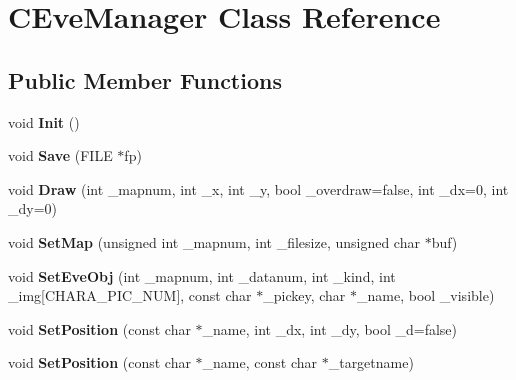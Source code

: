 \hypertarget{class_c_eve_manager}{}\section{C\+Eve\+Manager Class Reference}
\label{class_c_eve_manager}
\subsection*{Public Member Functions}
\begin{DoxyCompactItemize}
\item 
void {\bfseries Init} ()\hypertarget{class_c_eve_manager_a81b830f9b23ebba1e077c3e47f72f0f6}{}\label{class_c_eve_manager_a81b830f9b23ebba1e077c3e47f72f0f6}

\item 
void {\bfseries Save} (F\+I\+LE $\ast$fp)\hypertarget{class_c_eve_manager_adb2b8e538af22ca621a6287cf838ab9b}{}\label{class_c_eve_manager_adb2b8e538af22ca621a6287cf838ab9b}

\item 
void {\bfseries Draw} (int \+\_\+mapnum, int \+\_\+x, int \+\_\+y, bool \+\_\+overdraw=false, int \+\_\+dx=0, int \+\_\+dy=0)\hypertarget{class_c_eve_manager_a6fab97f20090b6151b8bae156468000f}{}\label{class_c_eve_manager_a6fab97f20090b6151b8bae156468000f}

\item 
void {\bfseries Set\+Map} (unsigned int \+\_\+mapnum, int \+\_\+filesize, unsigned char $\ast$buf)\hypertarget{class_c_eve_manager_a31457fdd1db1d4a1dd57a6d9e125b1ee}{}\label{class_c_eve_manager_a31457fdd1db1d4a1dd57a6d9e125b1ee}

\item 
void {\bfseries Set\+Eve\+Obj} (int \+\_\+mapnum, int \+\_\+datanum, int \+\_\+kind, int \+\_\+img\mbox{[}C\+H\+A\+R\+A\+\_\+\+P\+I\+C\+\_\+\+N\+UM\mbox{]}, const char $\ast$\+\_\+pickey, char $\ast$\+\_\+name, bool \+\_\+visible)\hypertarget{class_c_eve_manager_a2d31d0d756b85416f121ff94b0715352}{}\label{class_c_eve_manager_a2d31d0d756b85416f121ff94b0715352}

\item 
void {\bfseries Set\+Position} (const char $\ast$\+\_\+name, int \+\_\+dx, int \+\_\+dy, bool \+\_\+d=false)\hypertarget{class_c_eve_manager_a5abb9c13b74f5597e7598513cedc7248}{}\label{class_c_eve_manager_a5abb9c13b74f5597e7598513cedc7248}

\item 
void {\bfseries Set\+Position} (const char $\ast$\+\_\+name, const char $\ast$\+\_\+targetname)\hypertarget{class_c_eve_manager_a26d64a722dfc2f65a1b6d0d30c20d2f5}{}\label{class_c_eve_manager_a26d64a722dfc2f65a1b6d0d30c20d2f5}


\end{DoxyCompactItemize}

